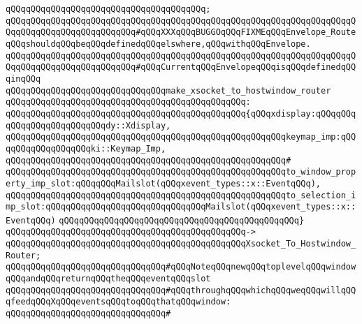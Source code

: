 \verb|qQQqqQQqqQQqqQQqqQQqqQQqqQQqqQQqqQQqqQQq;|\newline
\verb|qQQqqQQqqQQqqQQqqQQqqQQqqQQqqQQqqQQqqQQqqQQqqQQqqQQqqQQqqQQqqQQqqQQqqQQqqQQqqQQqqQQqqQQqqQQqqQQq#qQQqXXXqQQqBUGGOqQQqFIXMEqQQqEnvelope_RouteqQQqshouldqQQqbeqQQqdefinedqQQqelswhere,qQQqwithqQQqEnvelope.|\newline
\verb|qQQqqQQqqQQqqQQqqQQqqQQqqQQqqQQqqQQqqQQqqQQqqQQqqQQqqQQqqQQqqQQqqQQqqQQqqQQqqQQqqQQqqQQqqQQqqQQq#qQQqCurrentqQQqEnvelopeqQQqisqQQqdefinedqQQqinqQQq|\newline
\newline
\verb|qQQqqQQqqQQqqQQqqQQqqQQqqQQqqQQqmake_xsocket_to_hostwindow_router|\newline
\verb|qQQqqQQqqQQqqQQqqQQqqQQqqQQqqQQqqQQqqQQqqQQqqQQq:|\newline
\verb|qQQqqQQqqQQqqQQqqQQqqQQqqQQqqQQqqQQqqQQqqQQqqQQq{qQQqxdisplay:qQQqqQQqqQQqqQQqqQQqqQQqqQQqdy::Xdisplay,|\newline
\verb|qQQqqQQqqQQqqQQqqQQqqQQqqQQqqQQqqQQqqQQqqQQqqQQqqQQqqQQqkeymap_imp:qQQqqQQqqQQqqQQqqQQqki::Keymap_Imp,|\newline
\verb|qQQqqQQqqQQqqQQqqQQqqQQqqQQqqQQqqQQqqQQqqQQqqQQqqQQqqQQq#|\newline
\verb|qQQqqQQqqQQqqQQqqQQqqQQqqQQqqQQqqQQqqQQqqQQqqQQqqQQqqQQqto_window_property_imp_slot:qQQqqQQqMailslot(qQQqxevent_types::x::EventqQQq),|\newline
\verb|qQQqqQQqqQQqqQQqqQQqqQQqqQQqqQQqqQQqqQQqqQQqqQQqqQQqqQQqto_selection_imp_slot:qQQqqQQqqQQqqQQqqQQqqQQqqQQqqQQqMailslot(qQQqxevent_types::x::EventqQQq)|\newline
\verb|qQQqqQQqqQQqqQQqqQQqqQQqqQQqqQQqqQQqqQQqqQQqqQQq}|\newline
\verb|qQQqqQQqqQQqqQQqqQQqqQQqqQQqqQQqqQQqqQQqqQQqqQQq->|\newline
\verb|qQQqqQQqqQQqqQQqqQQqqQQqqQQqqQQqqQQqqQQqqQQqqQQqXsocket_To_Hostwindow_Router;|\newline
\newline
\verb|qQQqqQQqqQQqqQQqqQQqqQQqqQQqqQQq#qQQqNoteqQQqnewqQQqtoplevelqQQqwindowqQQqandqQQqreturnqQQqtheqQQqeventqQQqslot|\newline
\verb|qQQqqQQqqQQqqQQqqQQqqQQqqQQqqQQq#qQQqthroughqQQqwhichqQQqweqQQqwillqQQqfeedqQQqXqQQqeventsqQQqtoqQQqthatqQQqwindow:|\newline
\verb|qQQqqQQqqQQqqQQqqQQqqQQqqQQqqQQq#|\newline
